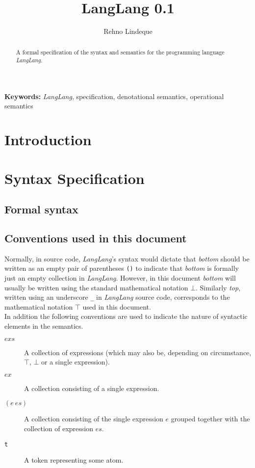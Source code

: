 \documentclass[a4paper,11pt]{article}
\begin{document}
\title{LangLang 0.1}
\author{Rehno Lindeque}

\maketitle

\begin{abstract}
A formal specification of the syntax and semantics for the programming language \textsl{LangLang}.
\end{abstract}
\textbf{Keywords:} \textsl{LangLang}, specification, denotational semantics, operational semantics

\section{Introduction}

\section{Syntax Specification}
\subsection{Formal syntax}

\subsection{Conventions used in this document}
\label{sec:conventions}

Normally, in source code, \textsl{LangLang}'s syntax would dictate that \emph{bottom} should be written as an empty pair of parentheses \texttt{()} to indicate that \emph{bottom} is formally just an empty collection in \textsl{LangLang}.
However, in this document \emph{bottom} will usually be written using the standard mathematical notation $\bot$.
Similarly \emph{top}, written using an underscore \texttt{\_} in \textsl{LangLang} source code, corresponds to the mathematical notation $\top$ used in this document.\\

In addition the following conventions are used to indicate the nature of syntactic elements in the semantics.

\begin{description}
  \item[$exs$] A collection of expressions (which may also be, depending on circumstance, $\top$, $\bot$ or a single expression).
  \item[$ex$] A collection consisting of a single expression.
  \item[$(e\ es)$] A collection consisting of the single expression $e$ grouped together with the collection of expression $es$.
  \item[\texttt{t}] A token representing some atom.
\end{description}
\end{document}
